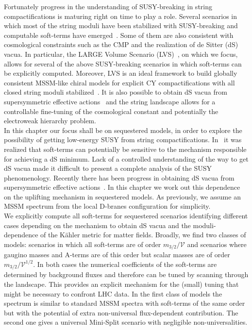 \documentclass[12pt,a4paper]{book}
\begin{document}
Fortunately progress in the understanding of SUSY-breaking in string compactifications is maturing right on time to play a role. Several scenarios in which most of the string moduli have been stabilized with SUSY-breaking and computable soft-terms have emerged~\cite{Choi:2005ge,Nilles:1997cm,Conlon:2006us,Conlon:2006wz, Lowen:2008fm, deAlwis:2009fn, Cicoli:2013rwa,Acharya:2008zi}. Some of them are also consistent with cosmological constraints such as the CMP and the realization of de Sitter (dS) vacua. In particular, the LARGE Volume Scenario (LVS)~\cite{Balasubramanian:2005zx}, on which we focus, allows for several of the above SUSY-breaking scenarios in which soft-terms can be explicitly computed. Moreover, LVS is an ideal framework to build globally consistent MSSM-like chiral models for explicit CY compactifications with all closed string moduli stabilized~\cite{Cicoli:2011qg,Cicoli:2013mpa,Cicoli:2012vw,Cicoli:2013cha}. It is also possible to obtain dS vacua from supersymmetric effective actions~\cite{Cicoli:2012vw,Cicoli:2012fh} and the string landscape allows for a controllable fine-tuning of the cosmological constant and potentially the electroweak hierarchy problem.\\

In this chapter our focus shall be on sequestered models, in order to explore the possibility of getting low-energy SUSY from string compactifications. In~\cite{Blumenhagen:2009gk} it was realized that soft-terms can potentially be sensitive to the mechanism responsible for achieving a dS minimum. Lack of a controlled understanding of the way to get dS vacua made it difficult to present a complete analysis of the SUSY phenomenology. Recently there has been progress in obtaining dS vacua from supersymmetric effective actions~\cite{Cicoli:2013mpa, Cicoli:2012vw, Cicoli:2012fh, Cicoli:2013cha,Krippendorf:2009zza}. In this chapter we work out this dependence on the uplifting mechanism in sequestered models. As previously, we assume an MSSM spectrum from the local D-branes configuration for simplicity.\\

We explicitly compute all soft-terms for sequestered scenarios identifying different cases depending on the mechanism to obtain dS vacua and the moduli-dependence of the K\"ahler metric for matter fields. Broadly, we find two classes of models: scenarios in which all soft-terms are of order $m_{3/2}/\mathcal{V}$ and scenarios where gaugino masses and A-terms are of this order but scalar masses are of order $m_{3/2}/\mathcal{V}^{1/2}$. In both cases the numerical coefficients of the soft-terms are determined by background fluxes and therefore can be tuned by scanning through the landscape. This provides an explicit mechanism for the (small) tuning that might be necessary to confront LHC data. In the first class of models the spectrum is similar to standard MSSM spectra with soft-terms of the same order but with the potential of extra non-universal flux-dependent contribution. The second one gives a universal Mini-Split scenario with negligible non-universalities.\\
\end{document}
